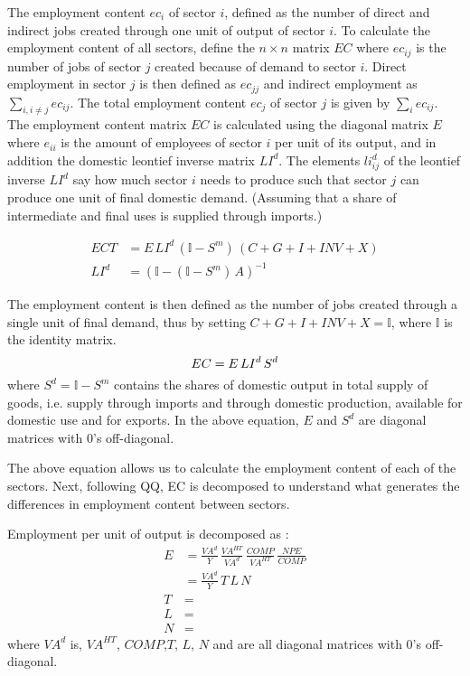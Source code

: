 \documentclass[12pt,english]{article}
\newcommand{\mli}[1]{\mathit{#1}}
\begin{document}
The employment content $ec_i$ of sector $i$, defined as the number of direct and indirect jobs created through one unit of output of sector $i$. To calculate the employment content of all sectors, define the $n \times n$ matrix $EC$ where $ec_{ij}$  is the number of jobs of sector $j$ created because of demand to sector $i$. Direct employment in sector $j$ is then defined as $ec_{jj}$ and indirect employment as $\sum_{i, i\neq j} ec_{ij}$. The total employment content $ec_j$ of sector $j$ is given by $\sum_i ec_{ij}$. The employment content matrix $EC$ is calculated using the diagonal matrix $E$ where $e_{ii}$ is the amount of employees of sector $i$ per unit of its output, and in addition the domestic leontief inverse matrix $LI^d$. The elements $li_{ij}^d$ of the leontief inverse $LI^d$ say how much sector $i$ needs to produce such that sector $j$ can produce one unit of final domestic demand. (Assuming that a share of intermediate and final uses is supplied through imports.)

\begin{align}
	ECT	 &= E\, LI^d \, (\mathbb{I} - S^m)\, (C + G + I + INV + X) \label{IO3} \\ 
	LI^d &= (\mathbb{I} - (\mathbb{I}-S^m)\, A)^{-1} \label{leontiefInverse_d}
\end{align}

The employment content is then defined as the number of jobs created through a single unit of final demand, thus by setting $C + G + I + INV + X=\mathbb{I}$, where $\mathbb{I}$ is the identity matrix. 
\begin{equation}
	EC	= E\, LI^d \, S^d \label{EC} \\ 
\end{equation}
where $S^d = \mathbb{I} - S^m$ contains the shares of domestic output in total supply of goods, i.e. supply through imports and through domestic production, available for domestic use and for exports. In the above equation, $E$ and $S^d$ are diagonal matrices with 0's off-diagonal.


The above equation allows us to calculate the employment content of each of the sectors. Next, following QQ, EC is decomposed to understand what generates the differences in employment content between sectors. 

Employment per unit of output is decomposed as :
\begin{align}
	E &= \frac{\mli{VA^d}}{Y} \, \frac{\mli{VA}^{HT}}{\mli{VA}^d} \, \frac{\mli{COMP}}{\mli{VA^{HT}}} \, \frac{\mli{NPE}}{\mli{COMP}}   \label{decompE} \\ 
	&= \frac{\mli{VA^d}}{Y} \, T \, L \, N \\
	T &= \\
	L &= \\
	N &= 
\end{align}
where $\mli{VA^d}$ is, $\mli{VA}^{HT}$, $\mli{COMP}$,$T$, $L$, $N$ and are all diagonal matrices with 0's off-diagonal.
\end{document}
